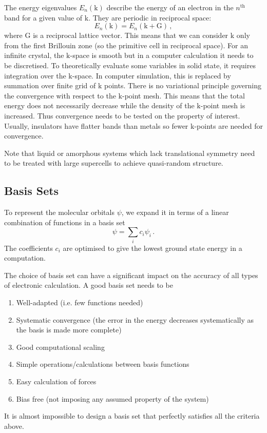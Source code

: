 \documentclass{article}
\theoremstyle{plain}\theoremheaderfont{\normalfont\itshape}\theorembodyfont{\rmfamily}\theoremseparator{.}\newtheorem*{rem}{Remark}\newtheorem*{ex}{Example}\newtheorem*{proof}{Proof}\newtheorem*{altp}{Alternative proof}
\theoremstyle{plain}\theoremheaderfont{\normalfont\bfseries}\theorembodyfont{\rmfamily}\theoremseparator{.}\newtheorem{thm}{Theorem}[section]\newtheorem{lem}[thm]{Lemma}\newtheorem{prop}[thm]{Proposition}\newtheorem*{cor}{Corollary}\newtheorem{defn}[thm]{Definition}\newtheorem{clm}[thm]{Claim}\newtheorem{clminproof}{Claim}\newtheorem{pos}{Postulate}[section]
\theoremstyle{break}\theoremheaderfont{\normalfont\itshape}\theorembodyfont{\rmfamily}\theoremseparator{.\medskip}\newtheorem*{proofskip}{Proof}\newtheorem*{exs}{Examples}\newtheorem*{rems}{Remarks}
\theoremstyle{break}\theoremheaderfont{\normalfont\bfseries}\theorembodyfont{\rmfamily}\theoremseparator{.\medskip}\newtheorem{lemskip}[thm]{Lemma}\newtheorem{defnskip}[thm]{Definition}\newtheorem{propskip}[thm]{Proposition}\newtheorem{thmskip}[thm]{Theorem}
\numberwithin{equation}{section}
\newcommand{\vb}[1]{\bm{\mathrm{#1}}}
\begin{document}
    The energy eigenvalues \(E_n(\vb{k})\) describe the energy of an electron in the \(n^{\text{th}}\) band for a given value of \(\vb{k}\). They are periodic in reciprocal space:
    \begin{equation}
        E_n(\vb{k})=E_n(\vb{k}+\vb{G})\,,
    \end{equation}
    where \(\vb{G}\) is a reciprocal lattice vector. This means that we can consider \(\vb{k}\) only from the first Brillouin zone (so the primitive cell in reciprocal space). For an infinite crystal, the \(\vb{k}\)-space is smooth but in a computer calculation it needs to be discretised. To theoretically evaluate some variables in solid state, it requires integration over the \(\vb{k}\)-space. In computer simulation, this is replaced by summation over finite grid of \(\vb{k}\) points. There is no variational principle governing the convergence with respect to the \(\vb{k}\)-point mesh. This means that the total energy does not necessarily decrease while the density of the \(\vb{k}\)-point mesh is increased. Thus convergence needs to be tested on the property of interest. Usually, insulators have flatter bands than metals so fewer \(\vb{k}\)-points are needed for convergence.

    Note that liquid or amorphous systems which lack translational symmetry need to be treated with large supercells to achieve quasi-random structure.

    \subsection{Basis Sets}
    To represent the molecular orbitals \(\psi\), we expand it in terms of a linear combination of functions in a basis set
    \begin{equation}
        \psi=\sum_i c_i\psi_i\,.
    \end{equation}
    The coefficients \(c_i\) are optimised to give the lowest ground state energy in a computation.

    The choice of basis set can have a significant impact on the accuracy of all types of electronic calculation. A good basis set needs to be
    \begin{enumerate}[topsep=0pt,label=(\roman*)]
        \item Well-adapted (i.e. few functions needed)
        \item Systematic convergence (the error in the energy decreases systematically as the basis is made more complete)
        \item Good computational scaling
        \item Simple operations/calculations between basis functions
        \item Easy calculation of forces
        \item Bias free (not imposing any assumed property of the system)
    \end{enumerate}
    It is almost impossible to design a basis set that perfectly satisfies all the criteria above.
\end{document}
